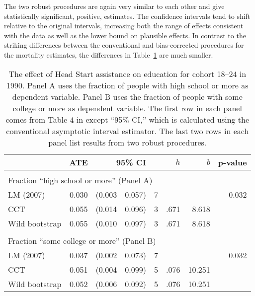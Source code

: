 \documentclass[12pt,fleqn]{article}
\begin{document}
The two robust procedures are again very similar to each other and give
statistically significant, positive, estimates. The confidence intervals tend to shift
relative to the original intervals, increasing both the range of effects consistent
with the data as well as the lower bound on plausible effects.
In contrast to the striking differences between the conventional
and bias-corrected procedures for the mortality estimates, the differences
in Table~\ref{tbl:3} are much smaller.

\begin{table}[t]
  \centering
  \begin{tabular}{lrr@{, }rr@{}rrr}
    \toprule
                   & ATE   & \multicolumn{2}{r}{95\% CI} & & $h$     & $b$ & p-value     \\
    \midrule                                                                          \\
    \multicolumn{5}{l}{Fraction ``high school or more'' (Panel A)}                    \\
    \midrule
    LM (2007)      & 0.030 & (0.003                      & 0.057) & 7&     &  & 0.032    \\
    CCT            & 0.055 & (0.014                      & 0.096) & 3&.671 & 8.618       \\
    Wild bootstrap & 0.055 & (0.010                      & 0.097) & 3&.671 & 8.618       \\\\
    \multicolumn{5}{l}{Fraction ``some college or more'' (Panel B)}                   \\
    \midrule
    LM (2007)      & 0.037 & (0.002                      & 0.073) & 7&     &  & 0.032 \T \\
    CCT            & 0.051 & (0.004                      & 0.099) & 5&.076 & 10.251      \\
    Wild bootstrap & 0.052 & (0.006                      & 0.092) & 5&.076 & 10.251      \\
    \bottomrule
  \end{tabular}
  \caption{The effect of Head Start assistance on education for cohort
    18--24 in 1990. Panel A uses the fraction of people with high school
    or more as dependent variable. Panel B uses the fraction of people
    with some college or more as dependent variable. The first row in
    each panel comes from Table 4 in \cite{ludwig2007} except ``95\% CI,''
    which is calculated using the conventional asymptotic interval estimator.
    The last two rows in
    each panel list results from two robust procedures.}
  \label{tbl:3}
\end{table}
\end{document}
